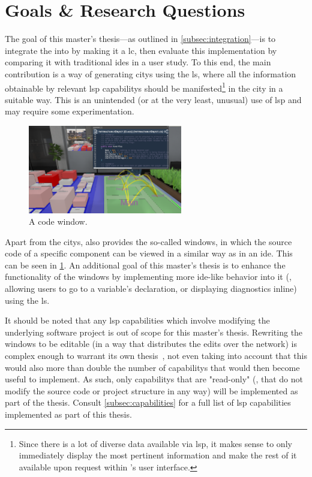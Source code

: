 \documentclass[../thesis]{subfiles}
\begin{document}
\section{Goals \& Research Questions}\label{sec:goals}
The goal of this master's thesis---as outlined in \cref{subsec:integration}---is to integrate the  into \SEE{} by making it a \gls{lc}, then evaluate this implementation by comparing it with traditional \glspl{ide} in a user study.
To this end, the main contribution is a way of generating \glspl{city} using the \gls{ls}, where all the information obtainable by relevant \gls{lsp} \glspl{capability} should be manifested\footnote{
	Since there is a lot of diverse data available via \gls{lsp}, it makes sense to only immediately display the most pertinent information and make the rest of it available upon request within \SEE{}'s user interface.
} in the city in a suitable way.
This is an unintended (or at the very least, unusual) use of \gls{lsp} and may require some experimentation.

\begin{figure}
	\captionsetup{type=figure}
	\centering
	\includegraphics[width=0.6\textwidth,trim={30.5cm 22cm 6cm 0},clip]{../figures/SEE_readme}
	\caption{A code window.}\label{fig:window}
\end{figure}

Apart from the \glspl{city}, \SEE{} also provides the so-called \glspl*{window}, in which the source code of a specific component can be viewed in a similar way as in an \gls{ide}.
This can be seen in \cref{fig:window}.
An additional goal of this master's thesis is to enhance the functionality of the \glspl{window} by implementing more \gls{ide}-like behavior into it (\eg, allowing users to go to a variable's declaration, or displaying diagnostics inline) using the \gls{ls}.

It should be noted that any \gls{lsp} capabilities which involve modifying the underlying software project is out of scope for this master's thesis.
Rewriting the \glspl{window} to be editable (in a way that distributes the edits over the network) is complex enough to warrant its own thesis~\cite[see also][]{moritz}, not even taking into account that this would also more than double the number of \glspl{capability} that would then become useful to implement.
As such, only \glspl{capability} that are "read-only" (\ie, that do not modify the source code or project structure in any way) will be implemented as part of the thesis.
Consult \cref{subsec:capabilities} for a full list of \gls{lsp} capabilities implemented as part of this thesis.
\end{document}
